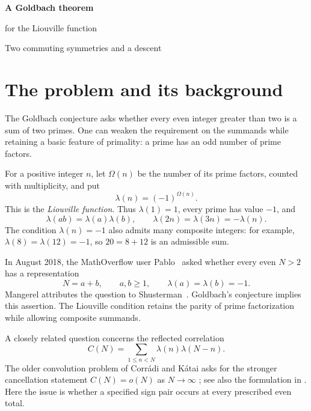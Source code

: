 \documentclass[11pt,a4paper]{article}
\theoremstyle{remark}
\numberwithin{equation}{section}
\newcommand{\lam}{\lambda}
\begin{document}
\thispagestyle{firstpage}
\begin{center}
  {\LARGE\bfseries A Goldbach theorem\par
   \vspace{3pt}for the Liouville function\par}
  \vspace{9pt}
  {\large Two commuting symmetries and a descent}
\end{center}
\vspace{8pt}

\section{The problem and its background}

The Goldbach conjecture asks whether every even integer greater than
two is a sum of two primes. One can weaken the requirement on the summands
while retaining a basic feature of primality: a prime has an odd number of
prime factors.

For a positive integer \(n\), let \(\Omega(n)\) be the number of its prime
factors, counted with multiplicity, and put
\[
  \lam(n)=(-1)^{\Omega(n)}.
\]
This is the \emph{Liouville function}. Thus \(\lam(1)=1\), every prime has
value \(-1\), and
\begin{equation}\label{eq:liouville}
  \lam(ab)=\lam(a)\lam(b),\qquad
  \lam(2n)=\lam(3n)=-\lam(n).
\end{equation}
The condition \(\lam(n)=-1\) also admits many composite integers: for
example, \(\lam(8)=\lam(12)=-1\), so \(20=8+12\) is an admissible sum.

In August 2018, the MathOverflow user Pablo~\cite{MathOverflow} asked
whether every even \(N>2\) has a representation
\begin{equation}\label{eq:question}
  N=a+b,\qquad a,b\ge1,\qquad \lam(a)=\lam(b)=-1.
\end{equation}
Mangerel attributes the question to Shusterman~\cite[Problem~1.1]{MangerelSigns}.
Goldbach's conjecture implies this assertion. The Liouville condition
retains the parity of prime factorization while allowing composite summands.

A closely related question concerns the reflected correlation
\[
  C(N)=\sum_{1\le n<N}\lam(n)\lam(N-n).
\]
The older convolution problem of Corr\'adi and K\'atai asks for the
stronger cancellation statement \(C(N)=o(N)\) as \(N\to\infty\)
\cite{CorradiKatai}; see also the formulation in
\cite[Conjecture~1]{Krishnamoorthy}. Here the issue is whether a specified
sign pair occurs at every prescribed even total.
\end{document}
